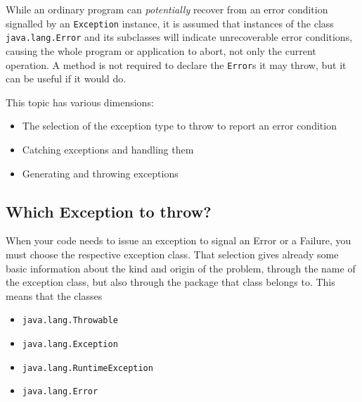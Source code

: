 While an ordinary program can \textit{potentially} recover from an error condition signalled by an \lstinline|Exception| instance, it is assumed that instances of the class \lstinline|java.lang.Error| and its subclasses will indicate unrecoverable error conditions, causing the whole program or application to abort, not only the current operation. A method is not required to declare the \lstinline|Error|s it may throw, but it can be useful if it would do.

This topic has various dimensions:
\begin{itemize}
	\item{The selection of the exception type to throw to report an error condition}
	\item{Catching exceptions and handling them}
	\item{Generating and throwing exceptions}
\end{itemize}



\subsection{Which Exception to throw?}\label{sec:WhichException}
When your code needs to issue an exception to signal an Error or a Failure, you must choose the respective exception class. That selection gives already some basic information about the kind and origin of the problem, through the name of the exception class, but also through the package that class belongs to. This means that the classes

\begin{itemize}[nosep]
	\item{\lstinline|java.lang.Throwable| \autocite{ORACLE_DOC_THROWABLE_CLASS}}
	\item{\lstinline|java.lang.Exception| \autocite{ORACLE_DOC_EXCEPTION_CLASS}}
	\item{\lstinline|java.lang.RuntimeException| \autocite{ORACLE_DOC_RUNTIMEEXCEPTION_CLASS}}
	\item{\lstinline|java.lang.Error| \autocite{ORACLE_DOC_ERROR_CLASS}}
\end{itemize}

